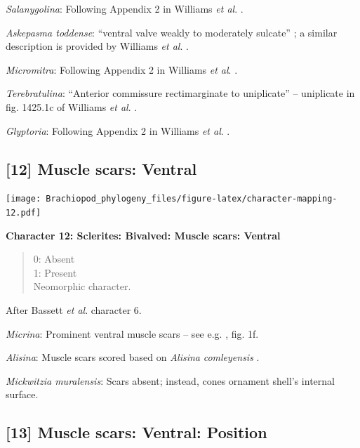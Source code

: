 \documentclass[openany]{book}
\theoremstyle{definition}
\theoremstyle{definition}
\theoremstyle{definition}
\theoremstyle{remark}
\begin{document}
\emph{Salanygolina}: Following Appendix 2 in Williams \emph{et al}.
\citeyearpar{Williams1998Thediversity}.

\emph{Askepasma toddense}: ``ventral valve weakly to moderately
sulcate'' \citep{Topper2013Theoldest}; a similar description is provided
by Williams \emph{et al}.
\citeyearpar{Williams2000BrachiopodaLinguliformea}.

\emph{Micromitra}: Following Appendix 2 in Williams \emph{et al}.
\citeyearpar{Williams1998Thediversity}.

\emph{Terebratulina}: ``Anterior commissure rectimarginate to
uniplicate'' -- uniplicate in fig. 1425.1c of Williams \emph{et al}.
\citeyearpar{Williams2006Rhynchonelliformeapart}.

\emph{Glyptoria}: Following Appendix 2 in Williams \emph{et al}.
\citeyearpar{Williams1998Thediversity}.

\hypertarget{muscle-scars-ventral}{%
\subsection*{{[}12{]} Muscle scars:
Ventral}\label{muscle-scars-ventral}}

\texttt{[image: Brachiopod\_phylogeny\_files/figure-latex/character-mapping-12.pdf]}

\textbf{Character 12: Sclerites: Bivalved: Muscle scars: Ventral }

\begin{quote}
0: Absent\\
1: Present\\
Neomorphic character.
\end{quote}

After Bassett \emph{et al}.
\citeyearpar{Bassett2001Functionalmorphology} character 6.

\emph{Micrina}: Prominent ventral muscle scars -- see e.g.
\citet{Holmer2008TheEarly}, fig. 1f.

\emph{Alisina}: Muscle scars scored based on \emph{Alisina}
\emph{comleyensis} \citep{Bassett2001Functionalmorphology}.

\emph{Mickwitzia muralensis}: Scars absent; instead, cones ornament
shell's internal surface.

\hypertarget{muscle-scars-ventral-position}{%
\subsection*{{[}13{]} Muscle scars: Ventral:
Position}\label{muscle-scars-ventral-position}}
\end{document}
